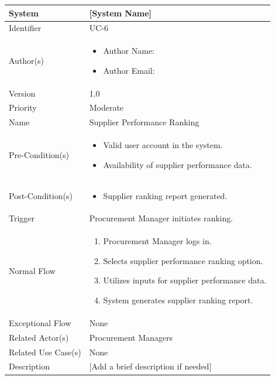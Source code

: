 \begin{center}
	\begin{tabularx}{\textwidth}{|l|X|}
		\hline
		System & [System Name] \\
		\hline
		Identifier & UC-6 \\
		\hline
		Author(s) & \begin{itemize}[left=0pt]
			\item Author Name:
			\item Author Email:
		\end{itemize} \\
		\hline
		Version & 1.0 \\
		\hline
		Priority & Moderate \\
		\hline
		Name & Supplier Performance Ranking \\
		\hline
		Pre-Condition(s) &  \begin{itemize}[left=0pt]
			\item Valid user account in the system.
			\item Availability of supplier performance data.
		\end{itemize} \\
		\hline
		Post-Condition(s) & \begin{itemize}[left=0pt]
			\item Supplier ranking report generated.
		\end{itemize} \\
		\hline
		Trigger & Procurement Manager initiates ranking. \\
		\hline
		Normal Flow & \begin{enumerate}[left=0pt]
			\item Procurement Manager logs in.
			\item Selects supplier performance ranking option.
			\item Utilizes inputs for supplier performance data.
			\item System generates supplier ranking report.
		\end{enumerate} \\
		\hline
		Exceptional Flow & None \\
		\hline
		Related Actor(s) & Procurement Managers \\
		\hline
		Related Use Case(s) & None \\
		\hline
		Description & [Add a brief description if needed] \\
		\hline
	\end{tabularx}
\end{center}

